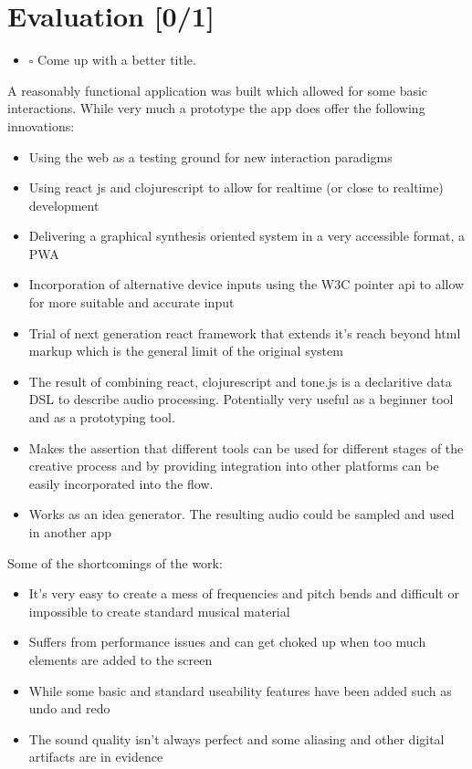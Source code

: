 \documentclass[a4paper,12pt]{article}
\begin{document}
\section{Evaluation [0/1]}
\label{sec:orgbd01659}
\begin{itemize}
\item $\square$ Come up with a better title.
\end{itemize}

A reasonably functional application was built which allowed for some basic
interactions. While very much a prototype the app does offer the following
innovations:

\begin{itemize}
\item Using the web as a testing ground for new interaction paradigms
\item Using react js and clojurescript to allow for realtime (or close to realtime)
development
\item Delivering a graphical synthesis oriented system in a very accessible format,
a PWA
\item Incorporation of alternative device inputs using the W3C pointer api to allow
for more suitable and accurate input
\item Trial of next generation react framework that extends it's reach beyond html
markup which is the general limit of the original system
\item The result of combining react, clojurescript and tone.js is a declaritive data
DSL to describe audio processing. Potentially very useful as a beginner tool
and as a prototyping tool.
\item Makes the assertion that different tools can be used for different stages of
the creative process and by providing integration into other platforms can be
easily incorporated into the flow.
\item Works as an idea generator. The resulting audio could be sampled and used in
another app
\end{itemize}

Some of the shortcomings of the work:
\begin{itemize}
\item It's very easy to create a mess of frequencies and pitch bends and difficult
or impossible to create standard musical material
\item Suffers from performance issues and can get choked up when too much elements
are added to the screen
\item While some basic and standard useability features have been added such as
undo and redo
\item The sound quality isn't always perfect and some aliasing and other digital
artifacts are in evidence
\end{itemize}
\end{document}
